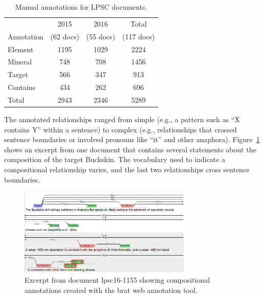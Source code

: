 \documentclass[letterpaper]{article} %
\begin{document}
\begin{table}
\caption{Manual annotations for LPSC documents.}
\label{tab:docs}
\begin{center}
\begin{tabular}{l|ccc}
           & 2015     & 2016     & Total \\ 
Annotation & (62 docs) & (55 docs) & (117 docs)\\ \hline
Element  & 1195 & 1029 & 2224 \\
Mineral  & 748  & 708  & 1456 \\
Target   & 566  & 347  &  913 \\ \hline
Contains & 434  & 262  &  696 \\ \hline
Total    & 2943 & 2346 & 5289 \\ \hline
\end{tabular}
\end{center}
\end{table}

The annotated relationships ranged from simple (e.g., a pattern such
as ``X contains Y'' within a sentence) to complex (e.g., relationships
that crossed sentence boundaries or involved pronouns like ``it'' and
other anaphora).  Figure~\ref{fig:brat} shows an excerpt from one
document that contains several statements about the composition of the
target Buckskin.  The vocabulary used to indicate a compositional
relationship varies, and the last two relationships cross sentence
boundaries.  

\begin{figure}
\begin{center}
\includegraphics[width=3.25in]{fig/brat-example.png}
\end{center}
\caption{Excerpt from document lpsc16-1155 showing compositional
annotations created with the brat web annotation tool.}
\label{fig:brat}
\end{figure}

\end{document}
